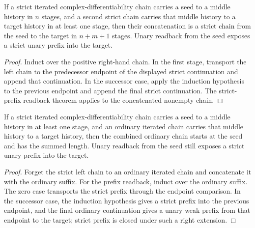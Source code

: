 \begin{theorem}
\label{thm:iterated-strict-cplx-diff-add-closed-strict-prefix-readback}
If a strict iterated complex-differentiability chain carries a seed to a
middle history in $n$ stages, and a second strict chain carries that middle
history to a target history in at least one stage, then their concatenation is
a strict chain from the seed to the target in $n+m+1$ stages. Unary readback
from the seed exposes a strict unary prefix into the target.
\end{theorem}
\begin{proof}
Induct over the positive right-hand chain. In the first stage, transport the
left chain to the predecessor endpoint of the displayed strict continuation
and append that continuation. In the successor case, apply the induction
hypothesis to the previous endpoint and append the final strict continuation.
The strict-prefix readback theorem applies to the concatenated nonempty chain.
\end{proof}

\begin{theorem}
\label{thm:iterated-strict-cplxdiff-ordinary-suffix-strict-prefix-readback}
If a strict iterated complex-differentiability chain carries a seed to a
middle history in at least one stage, and an ordinary iterated chain carries
that middle history to a target history, then the combined ordinary chain
starts at the seed and has the summed length. Unary readback from the seed
still exposes a strict unary prefix into the target.
\end{theorem}
\begin{proof}
Forget the strict left chain to an ordinary iterated chain and concatenate it
with the ordinary suffix. For the prefix readback, induct over the ordinary
suffix. The zero case transports the strict prefix through the endpoint
comparison. In the successor case, the induction hypothesis gives a strict
prefix into the previous endpoint, and the final ordinary continuation gives
a unary weak prefix from that endpoint to the target; strict prefix is closed
under such a right extension.
\end{proof}

